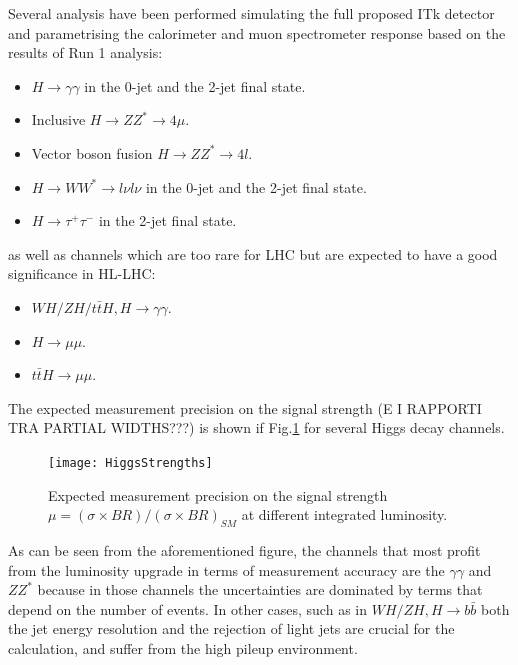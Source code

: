 \documentclass[a4paper,twoside,12pt]{article}
\begin{document}
Several analysis have been performed simulating the full proposed ITk detector and
parametrising the calorimeter and muon spectrometer response based on the results of
Run 1 analysis\cite{loi}\cite{scoping}:

\begin{itemize}
\item $H \rightarrow \gamma\gamma$ in the 0-jet and the 2-jet final state.
\item Inclusive $H \rightarrow ZZ^{*} \rightarrow 4\mu$.
\item Vector boson fusion $H \rightarrow ZZ^{*} \rightarrow 4l$.
\item $H \rightarrow WW^* \rightarrow l\nu l\nu$ in the 0-jet and the 2-jet final state.
\item $H \rightarrow \tau^+\tau^-$ in the 2-jet final state.
\end{itemize}

as well as channels which are too rare for LHC but are expected to have a good significance
in HL-LHC:
\begin{itemize}
\item $WH/ZH/t\bar{t}H, H \rightarrow \gamma\gamma$.
\item $H \rightarrow \mu\mu$.
\item $t\bar{t}H \rightarrow \mu\mu$.
\end{itemize}

The expected measurement precision on the signal strength (E I RAPPORTI TRA PARTIAL WIDTHS???) is shown if Fig.\ref{fig:HiggsStrengths} for several Higgs decay channels. 

\begin{figure} [h]
	\centering
	\texttt{[image: HiggsStrengths]}
	\caption{Expected measurement precision on the signal strength $\mu = (\sigma \times BR)/(\sigma \times BR)_{SM}$\cite{loi} at different integrated luminosity.}
	\label{fig:HiggsStrengths}
\end{figure}

As can be seen from the aforementioned figure, the channels that most profit from the
luminosity upgrade in terms of measurement accuracy are the $\gamma\gamma$ and $ZZ^*$
because in those channels the uncertainties are dominated by terms that depend on the
number of events. In other cases, such as in $WH/ZH, H \rightarrow b\bar{b}$ both the jet
energy resolution and the rejection of light jets are crucial for the calculation, and suffer from
the high pileup environment. \\
\end{document}
